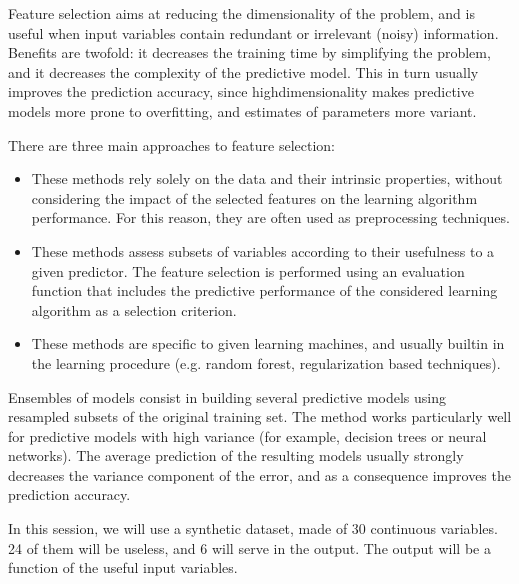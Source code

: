 \documentclass[letterpaper,10pt,english]{jupyterBook}
\begin{document}
\sphinxAtStartPar
Feature selection aims at reducing the dimensionality of the problem, and is useful when input variables contain redundant or irrelevant (noisy) information. Benefits are twofold: it decreases the training time by simplifying the problem, and it decreases the complexity of the predictive model. This in turn usually improves the prediction accuracy, since high\sphinxhyphen{}dimensionality makes predictive models more prone to overfitting, and estimates of parameters more variant.

\sphinxAtStartPar
There are three main approaches to feature selection:
\begin{itemize}
\item {} 
\sphinxAtStartPar
{}
These methods rely solely on the data and their intrinsic properties, without considering the impact of the selected features on the learning algorithm performance. For this reason, they are often used as preprocessing techniques.

\item {} 
\sphinxAtStartPar
{}
These methods assess subsets of variables according to their usefulness to a given predictor. The feature selection is performed using an evaluation function that includes the predictive performance of the considered learning algorithm as a selection criterion.

\item {} 
\sphinxAtStartPar
{}
These methods are specific to given learning machines, and usually built\sphinxhyphen{}in in the learning procedure (e.g. random forest, regularization based techniques).

\end{itemize}

\sphinxAtStartPar
Ensembles of models consist in building several predictive models using resampled subsets of the original training set. The method works particularly well for predictive models with high variance (for example, decision trees or neural networks). The average prediction of the resulting models usually strongly decreases the variance component of the error, and as a consequence improves the prediction accuracy.

\sphinxAtStartPar
In this session, we will use a synthetic dataset, made of 30 continuous variables. 24 of them will be useless, and 6 will serve in the output. The output will be a function of the useful input variables.
\end{document}
